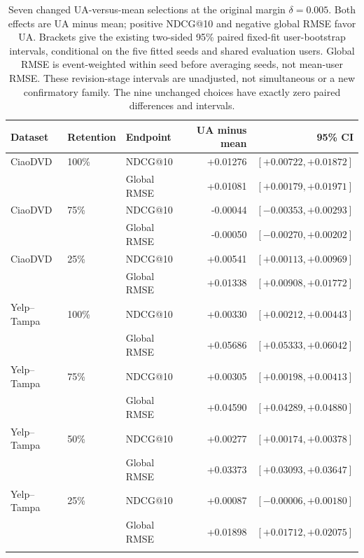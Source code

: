 \begin{table}[H]
\centering
\caption{Seven changed UA-versus-mean selections at the original margin $\delta=0.005$. Both effects are UA minus mean; positive NDCG@10 and negative global RMSE favor UA. Brackets give the existing two-sided 95\% paired fixed-fit user-bootstrap intervals, conditional on the five fitted seeds and shared evaluation users. Global RMSE is event-weighted within seed before averaging seeds, not mean-user RMSE. These revision-stage intervals are unadjusted, not simultaneous or a new confirmatory family. The nine unchanged choices have exactly zero paired differences and intervals.}
\label{tab:coverage-ablation-ci}
\small
\setlength{\tabcolsep}{4pt}
\begin{tabular}{@{}lllrr@{}}
\toprule
Dataset & Retention & Endpoint & UA minus mean & 95\% CI \\
\midrule
CiaoDVD & 100\% & NDCG@10 & +0.01276 & $[+0.00722, +0.01872]$ \\
 & & Global RMSE & +0.01081 & $[+0.00179, +0.01971]$ \\
\addlinespace
CiaoDVD & 75\% & NDCG@10 & -0.00044 & $[-0.00353, +0.00293]$ \\
 & & Global RMSE & -0.00050 & $[-0.00270, +0.00202]$ \\
\addlinespace
CiaoDVD & 25\% & NDCG@10 & +0.00541 & $[+0.00113, +0.00969]$ \\
 & & Global RMSE & +0.01338 & $[+0.00908, +0.01772]$ \\
\addlinespace
Yelp--Tampa & 100\% & NDCG@10 & +0.00330 & $[+0.00212, +0.00443]$ \\
 & & Global RMSE & +0.05686 & $[+0.05333, +0.06042]$ \\
\addlinespace
Yelp--Tampa & 75\% & NDCG@10 & +0.00305 & $[+0.00198, +0.00413]$ \\
 & & Global RMSE & +0.04590 & $[+0.04289, +0.04880]$ \\
\addlinespace
Yelp--Tampa & 50\% & NDCG@10 & +0.00277 & $[+0.00174, +0.00378]$ \\
 & & Global RMSE & +0.03373 & $[+0.03093, +0.03647]$ \\
\addlinespace
Yelp--Tampa & 25\% & NDCG@10 & +0.00087 & $[-0.00006, +0.00180]$ \\
 & & Global RMSE & +0.01898 & $[+0.01712, +0.02075]$ \\
\addlinespace
\bottomrule
\end{tabular}
\end{table}
